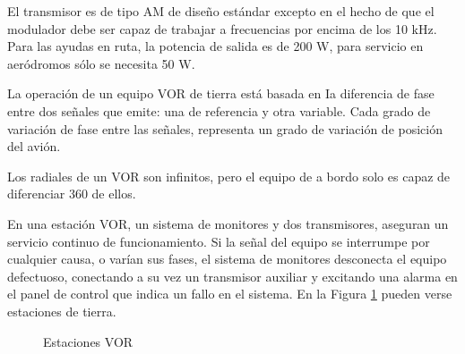 El transmisor es de tipo AM de diseño estándar excepto en el hecho de que el modulador debe ser capaz de trabajar a  frecuencias por encima de los 10 kHz. Para las ayudas en ruta, la potencia de salida es de 200 W, para servicio en aeródromos sólo se necesita 50 W.

La operación de un equipo VOR de tierra está basada en Ia diferencia de fase entre dos señales que emite: una de referencia y otra variable. Cada grado de variación de fase entre las señales, representa un grado de variación de posición del avión.

Los radiales de un VOR son infinitos, pero el equipo de a bordo solo es capaz de diferenciar 360 de ellos.

En una estación VOR, un sistema de monitores y dos transmisores, aseguran un servicio continuo de funcionamiento. Si la señal del equipo se interrumpe por cualquier causa, o varían sus fases, el sistema de monitores desconecta el equipo defectuoso, conectando a su vez un transmisor auxiliar y excitando una alarma en el panel de control que indica un fallo en el sistema. En la Figura \ref{fig:estaciones_VOR}  pueden verse estaciones de tierra. 

\begin{figure}[!htb]
  \centering
  \caption{Estaciones VOR}\label{fig:estaciones_VOR}
\end{figure}



